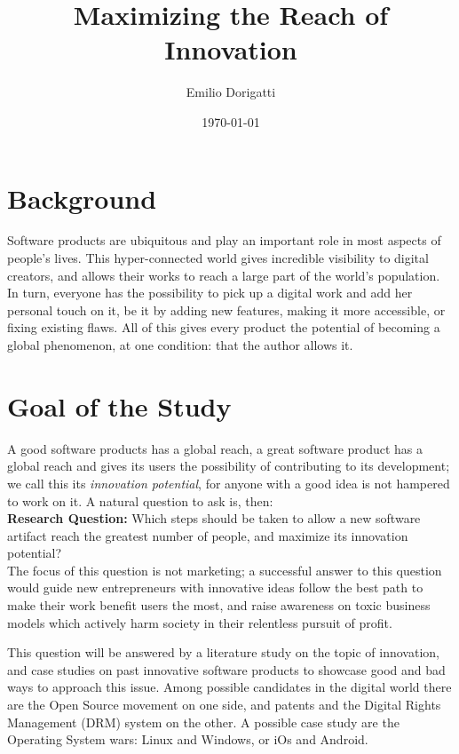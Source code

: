 \documentclass[12pt]{article}
\author{Emilio Dorigatti}
\date{\today}
\title{Maximizing the Reach of Innovation}
\begin{document}
\maketitle

\section{Background}
\label{sec:orgdd3f614}
Software products are ubiquitous and play an important role in most aspects of
people's lives. This hyper-connected world gives incredible visibility to
digital creators, and allows their works to reach a large part of the world's
population. In turn, everyone has the possibility to pick up a digital work and
add her personal touch on it, be it by adding new features, making it more
accessible, or fixing existing flaws. All of this gives every product the
potential of becoming a global phenomenon, at one condition: that the author
allows it.

\section{Goal of the Study}
\label{sec:orgff471b8}
A good software products has a global reach, a great software product has a
global reach and gives its users the possibility of contributing to its
development; we call this its \emph{innovation potential}, for anyone with a good
idea is not hampered to work on it. A natural question to ask is, then: \\

\textbf{Research Question:} Which steps should be taken to allow a new software
artifact reach the greatest number of people, and maximize its innovation
potential? \\

The focus of this question is not marketing; a successful answer to this
question would guide new entrepreneurs with innovative ideas follow the best
path to make their work benefit users the most, and raise awareness on toxic
business models which actively harm society in their relentless pursuit of
profit.

This question will be answered by a literature study on the topic of innovation,
and case studies on past innovative software products to showcase good and bad
ways to approach this issue. Among possible candidates in the digital world
there are the Open Source movement on one side, and patents and the Digital
Rights Management (DRM) system on the other. A possible case study are the
Operating System wars: Linux and Windows, or iOs and Android.
\end{document}
